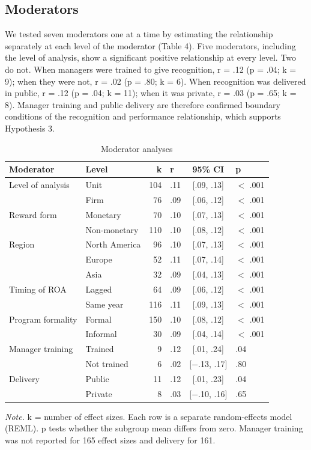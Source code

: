 \documentclass[11pt]{article}
\begin{document}
\subsection{Moderators}

We tested seven moderators one at a time by estimating the relationship separately at each level of the moderator (Table 4). Five moderators, including the level of analysis, show a significant positive relationship at every level. Two do not. When managers were trained to give recognition, r = .12 (p = .04; k = 9); when they were not, r = .02 (p = .80; k = 6). When recognition was delivered in public, r = .12 (p = .04; k = 11); when it was private, r = .03 (p = .65; k = 8). Manager training and public delivery are therefore confirmed boundary conditions of the recognition and performance relationship, which supports Hypothesis 3.

\begin{table}[H]
\centering
\small
\caption{Moderator analyses}
\begin{tabular}{llrlcl}
\toprule
Moderator & Level & k & r & 95\% CI & p \\
\midrule
Level of analysis & Unit & 104 & .11 & [.09, .13] & $<$ .001 \\
 & Firm & 76 & .09 & [.06, .12] & $<$ .001 \\
Reward form & Monetary & 70 & .10 & [.07, .13] & $<$ .001 \\
 & Non-monetary & 110 & .10 & [.08, .12] & $<$ .001 \\
Region & North America & 96 & .10 & [.07, .13] & $<$ .001 \\
 & Europe & 52 & .11 & [.07, .14] & $<$ .001 \\
 & Asia & 32 & .09 & [.04, .13] & $<$ .001 \\
Timing of ROA & Lagged & 64 & .09 & [.06, .12] & $<$ .001 \\
 & Same year & 116 & .11 & [.09, .13] & $<$ .001 \\
Program formality & Formal & 150 & .10 & [.08, .12] & $<$ .001 \\
 & Informal & 30 & .09 & [.04, .14] & $<$ .001 \\
Manager training & Trained & 9 & .12 & [.01, .24] & .04 \\
 & Not trained & 6 & .02 & [$-$.13, .17] & .80 \\
Delivery & Public & 11 & .12 & [.01, .23] & .04 \\
 & Private & 8 & .03 & [$-$.10, .16] & .65 \\
\bottomrule
\end{tabular}

\smallskip
\parbox{0.95\textwidth}{\footnotesize\textit{Note.} k = number of effect sizes. Each row is a separate random-effects model (REML). p tests whether the subgroup mean differs from zero. Manager training was not reported for 165 effect sizes and delivery for 161.}
\end{table}
\end{document}
